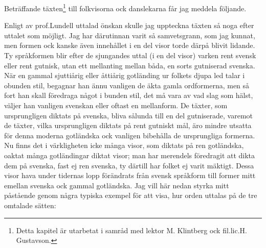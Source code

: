\fancyhfoffset[E,O]{0pt}
\addtolength{\skip\footins}{\baselineskip}
{


Beträffande täxten\footnote{Detta kapitel är utarbetat i samråd med lektor M. Klintberg ock fil.\@ lic.\@ H. Gustavson.} till folkvisorna ock danslekarna får
jag meddela följande.

\medskip

Enligt av prof.\@ Lundell uttalad önskan skulle jag uppteckna
täxten så noga efter uttalet som möjligt. Jag har
därutinnan varit så samvetsgrann, som jag kunnat, men formen
ock kanske även innehållet i en del visor torde därpå blivit
lidande. Ty språkformen blir efter de sjungandes uttal (i en
del visor) varken rent svensk eller rent gutnisk, utan ett
mellanting mellan båda, en sorts gutniserad svenska. När
en gammal sjuttiårig eller åttiårig gotländing ur folkets
djupa led talar i obunden stil, begagnar han ännu vanligen
de äkta gamla ordformerna, men så fort han skall föredraga
något i bunden stil, det må vara av vad slag som hälst, väljer
han vanligen svenskan eller oftast en mellanform. De täxter,
som ursprungligen diktats på svenska, bliva sålunda till en
del gutniserade, varemot de täxter, vilka ursprungligen diktats
på rent gutniskt mål, äro mindre utsatta för denna \guillemotright{}moderna\guillemotright{}
gotländska ock vanligen bibehålla de ursprungliga formerna.
Nu finns det i värkligheten icke många visor, som diktats
på ren gotländska, oaktat många gotländingar diktat visor;
man har merendels föredragit att dikta dem på svenska, fast
ej ren svenska, ty därtill har folket ej varit mäktigt.
Dessa visor hava under tidernas lopp förändrats från svensk
språkform till former mitt emellan svenska ock gammal gotländska.
Jag vill här nedan styrka mitt påstående genom några typiska
exempel för att visa, hur orden uttalas på de tre omtalade
sätten:

\bigskip

}

